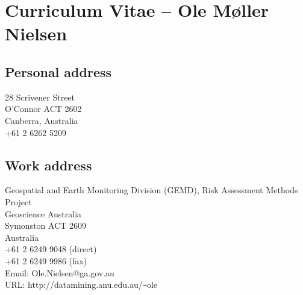 \documentclass[12pt,a4paper]{article}
\begin{document}
\section*{Curriculum Vitae -- Ole M{\o}ller Nielsen}

\subsection*{Personal address}
28 Scrivener Street \\
O'Connor ACT 2602 \\
Canberra, Australia \\
+61 2 6262 5209  

\subsection*{Work address}
Geospatial and Earth Monitoring Division (GEMD), 
Risk Assessment Methods Project \\
Geoscience Australia \\
Symonston ACT 2609 \\
Australia \\
+61 2 6249 9048 (direct)\\
+61 2 6249 9986 (fax)\\
Email: Ole.Nielsen@ga.gov.au \\
URL: http://datamining.anu.edu.au/\verb+~+ole
 
 
\end{document}
